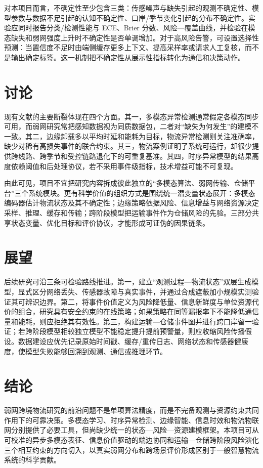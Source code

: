\documentclass[UTF8,12pt,a4paper]{ctexart}
\begin{document}
对本项目而言，不确定性至少包含三类：传感噪声与缺失引起的观测不确定性、模型参数与数据不足引起的认知不确定性、口岸/季节变化引起的分布不确定性。实验应同时报告分类/检测性能与 ECE、Brier 分数、风险—覆盖曲线，并检验在模态缺失和弱网强度上升时不确定性是否单调增加。对于高风险告警，可设置选择性预测：当置信度不足时由端侧缓存更多上下文、提高采样率或请求人工复核，而不是输出确定标签。这一机制把不确定性从展示性指标转化为通信和决策动作。

\section{讨论}

现有文献的主要断裂体现在四个方面。其一，多模态异常检测通常假定各模态同步可用，而弱网研究常把感知数据视为同质数据包，二者对“缺失为何发生”的建模不一致。其二，边缘卸载多以平均时延和能耗为目标，物流异常检测则关注准确率，缺少对稀有高损失事件的联合约束。其三，物流案例证明了系统可运行，却很少提供跨线路、跨季节和受控链路退化下的可重复基准。其四，时序异常模型的结果高度依赖阈值和后处理协议，若不采用事件级指标，技术增益可能不可复现。

由此可见，项目不宜把研究内容拆成彼此独立的“多模态算法、弱网传输、仓储平台”三个系统模块。更有科学价值的组织方式是围绕统一潜变量状态展开：多模态编码器估计物流状态及其不确定性；边缘策略依据风险、信息增益与网络资源决定采样、推理、缓存和传输；跨阶段模型把运输事件作为仓储风险的先验。三部分共享状态变量、优化目标和评价协议，才能形成可证伪的因果链条。

\section{展望}

后续研究可沿三条可检验路线推进。第一，建立“观测过程—物流状态”双层生成模型，显式区分网络丢失、传感器故障与真实事件，并通过合成遮蔽加小规模实测验证其可辨识边界。第二，将事件价值定义为风险降低量、信息新鲜度与单位资源代价的组合，研究具有安全约束的在线策略；如果策略在同等漏报率下不能降低通信量和能耗，则应拒绝其有效性。第三，构建运输—仓储事件图并进行跨口岸留一验证；若跨阶段模型相较独立模型不能稳定提升提前预警量，则应收缩风险传播假设。数据建设应优先记录原始时间戳、缓存/重传日志、网络状态和传感器健康度，使模型失败能够回溯到观测、通信或推理环节。

\section{结论}

弱网跨境物流研究的前沿问题不是单项算法精度，而是不完备观测与资源约束共同作用下的可靠决策。多模态学习、时序异常检测、边缘智能、信息时效和物流物联网分别提供了必要工具，但尚缺少统一的状态—风险—资源建模框架。本项目可从可校准的异步多模态表征、信息价值驱动的端边协同和运输—仓储跨阶段风险演化三个相互约束的方向切入，以真实弱网分布和跨场景评价形成区别于一般智慧物流系统的科学贡献。



\end{document}
